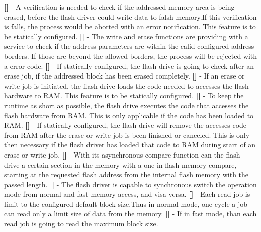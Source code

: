 \newline
{\bf []} - A verification is needed to check if the addressed memory area is being erased, before the flash driver could write data to falsh memory.If this verification is falls, the process would be aborted with an error notification. This feature is to be statically configured.\newline
\newline
{\bf []} - The write and erase functions are providing with a service to check if the address parameters are within the calid configured address borders. If those are beyond the allowed borders, the process will be rejected with a error code.\newline
\newline
{\bf []} - If statically configured, the flash drive is going to check after an erase job, if the addressed block has been erased completely.\newline
\newline
{\bf []} - If an erase or write job is initiated, the flash drive loads the code needed to accesses the flash hardware to \mbox{RAM}. This feature is to be statically configured.\newline
\newline
{\bf []} - To keep the runtime as short as possible, the flash drive executes the code that accesses the flash hardware from \mbox{RAM}. This is only applicable if the code has been loaded to \mbox{RAM}.\newline
\newline
{\bf []} - If statically configured, the flash drive will remove the accesses code from \mbox{RAM} after the erase or write job is been finished or canceled. This is only then necessary if the flash driver has loaded that code to \mbox{RAM} during start of an erase or write job.\newline
\newline
{\bf []} - With its asynchronous compare function can the flash drive a certain section in the memory with a one in flash memory compare, starting at the requested flash address from the internal flash memory with the passed length. \newline
\newline
{\bf []} - The flash driver is capable to synchronous switch the operation mode from normal and fast memory access, and visa versa.\newline
\newline
{\bf []} - Each read job is limit to the configured default block size.Thus in normal mode, one cycle a job can read only a limit size of data from the memory.\newline
\newline
{\bf []} - If in fast mode, than each read job is going to read the maximum block size.\newline
\newline
